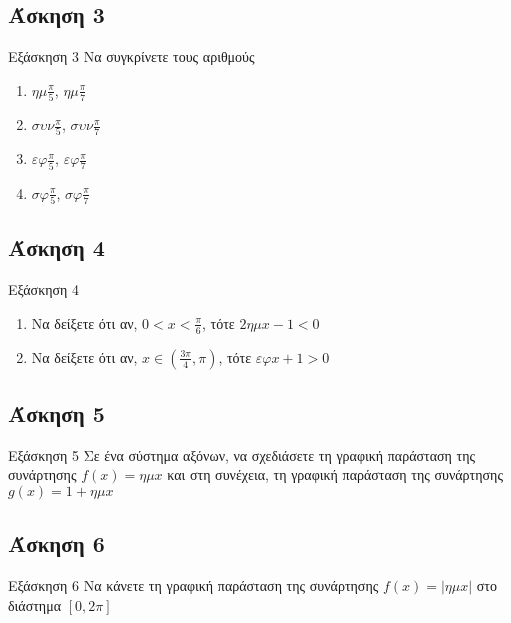 \documentclass[greek]{beamer}
\begin{document}
\subsection{Άσκηση 3}
\begin{frame}[label=Άσκηση3]{Εξάσκηση 3}
 Να συγκρίνετε τους αριθμούς
 \begin{enumerate}
  \item<1-> $ημ\frac{π}{5}$, $ημ\frac{π}{7}$
  \item<2-> $συν\frac{π}{5}$, $συν\frac{π}{7}$
  \item<3-> $εφ\frac{π}{5}$, $εφ\frac{π}{7}$
  \item<4-> $σφ\frac{π}{5}$, $σφ\frac{π}{7}$
 \end{enumerate}

\end{frame}

\subsection{Άσκηση 4}
\begin{frame}[label=Άσκηση4]{Εξάσκηση 4}
 \begin{enumerate}
  \item<1-> Να δείξετε ότι αν, $0<x<\frac{π}{6}$, τότε $2ημx-1<0$
  \item<2-> Να δείξετε ότι αν, $x\in(\frac{3π}{4},π)$, τότε $εφx+1>0$
 \end{enumerate}

\end{frame}

\subsection{Άσκηση 5}
\begin{frame}[label=Άσκηση5]{Εξάσκηση 5}
 Σε ένα σύστημα αξόνων, να σχεδιάσετε τη γραφική παράσταση της συνάρτησης $f(x)=ημx$ και στη συνέχεια, τη γραφική παράσταση της συνάρτησης $g(x)=1+ημx$

\end{frame}

\subsection{Άσκηση 6}
\begin{frame}[label=Άσκηση6]{Εξάσκηση 6}
 Να κάνετε τη γραφική παράσταση της συνάρτησης $f(x)=|ημx|$ στο διάστημα $[0,2π]$

\end{frame}
\end{document}
